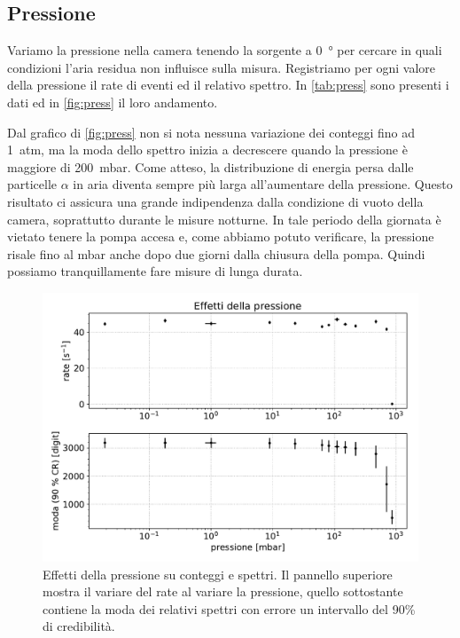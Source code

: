 \subsection{Pressione}

Variamo la pressione nella camera tenendo la sorgente a \SI{0}{\degree} per cercare in quali condizioni l'aria residua non influisce sulla misura.
Registriamo per ogni valore della pressione il rate di eventi ed il relativo spettro. In \autoref{tab:press} sono presenti i dati ed in \autoref{fig:press} il loro andamento.




Dal grafico di \autoref{fig:press} non si nota nessuna variazione dei conteggi fino ad \SI{1}{atm}, ma la moda dello spettro inizia a decrescere quando la pressione è maggiore di \SI{200}{mbar}. 
Come atteso, la distribuzione di energia persa dalle particelle $\alpha$ in aria diventa sempre più larga all'aumentare della pressione.
Questo risultato ci assicura una grande indipendenza dalla condizione di vuoto della camera, soprattutto durante le misure notturne. In tale periodo della giornata è vietato tenere la pompa accesa e, come abbiamo potuto verificare, la pressione risale fino al mbar anche dopo due giorni dalla chiusura della pompa. Quindi possiamo tranquillamente fare misure di lunga durata.

\begin{figure}[h]
\centering
\includegraphics[width=30 em]{immagini/press}
\caption{Effetti della pressione su conteggi e spettri. Il pannello superiore mostra il variare del rate al variare la pressione, quello sottostante contiene la moda dei relativi spettri con errore un intervallo del 90\% di credibilità.}
\label{fig:press}
\end{figure}




